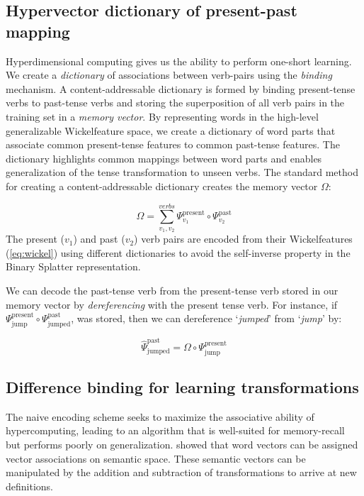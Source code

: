 \documentclass{article}
\begin{document}
\subsection{Hypervector dictionary of present-past mapping}

Hyperdimensional computing gives us the ability to perform one-short learning. We create a \emph{dictionary} of associations between verb-pairs using the \emph{binding} mechanism. A content-addressable dictionary is formed by binding present-tense verbs to past-tense verbs and storing the superposition of all verb pairs in the training set in a \emph{memory vector}. By representing words in the high-level generalizable Wickelfeature space, we create a dictionary of word parts that associate common present-tense features to common past-tense features. The dictionary highlights common mappings between word parts and enables generalization of the tense transformation to unseen verbs. The standard method for creating a content-addressable dictionary creates the memory vector $\Omega$:

\begin{equation}
\Omega = \sum_{v_1, v_2}^{verbs} \Psi^{\text{present}}_{v_1} \circ \Psi^{\text{past}}_{v_2}
\end{equation}
The present ($v_1$) and past ($v_2$) verb pairs are encoded from their Wickelfeatures (\ref{eq:wickel}) using different dictionaries to avoid the self-inverse property in the Binary Splatter representation. 

We can decode the past-tense verb from the present-tense verb stored in our memory vector by \emph{dereferencing} with the present tense verb. For instance, if $\Psi_{\text{jump}}^{\text{present}} \circ \Psi_{\text{jumped}}^{\text{past}}$, was stored, then we can dereference `\emph{jumped}' from `\emph{jump}' by:

\begin{equation}
\hat{\Psi}_{\text{jumped}}^{\text{past}} = \Omega \circ \Psi_{\text{jump}}^{\text{present}}
\end{equation}

\subsection{Difference binding for learning transformations}
The naive encoding scheme seeks to maximize the associative ability of hypercomputing, leading to an algorithm that is well-suited for memory-recall but performs poorly on generalization. \citet{Mikolov2013} showed that word vectors can be assigned vector associations on semantic space. These semantic vectors can be manipulated by the addition and subtraction of transformations to arrive at new definitions.
\end{document}
